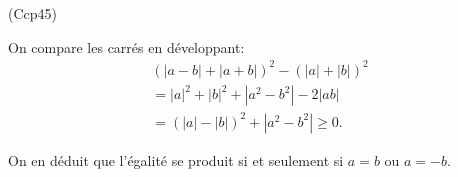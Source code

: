 \begin{tiny}(Ccp45)\end{tiny}
On compare les carrés en développant:
\begin{multline*}
  (|a-b| + |a+b|)^2 - (|a|+|b|)^2 \\
  = |a|^2 + |b|^2 + |a^2 - b^2| - 2|ab| \\
  =(|a| - |b|)^2 + |a^2 - b^2| \geq 0.
\end{multline*}

On en déduit que l'égalité se produit si et seulement si $a=b$ ou $a = -b$.
